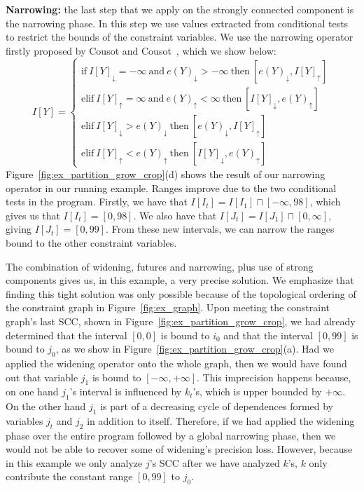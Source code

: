 \documentclass{sigplanconf}[10pt]
\newcommand{\lb}[1]{#1_{\downarrow}}
\newcommand{\ub}[1]{#1_{\uparrow}}
\begin{document}
\noindent
\textbf{Narrowing: } the last step that we apply on the strongly connected
component is the narrowing phase.
In this step we use values extracted from conditional tests to restrict the
bounds of the constraint variables.
We use the narrowing operator firstly proposed by Cousot and
Cousot~\cite{Cousot77}, which we show below:
%
\begin{equation*}
I[Y] =
\begin{cases}
\mbox{if} \ \lb{I[Y]} = -\infty  \ \mbox{and} \ \lb{e(Y)} > -\infty \ \mbox{then} \ [\lb{e(Y)}, \ub{I[Y]}] \\
\mbox{elif} \ \ub{I[Y]} = \infty \ \mbox{and} \ \ub{e(Y)} < \infty \ \mbox{then}
\ [\lb{I[Y]}, \ub{e(Y)}] \\
\mbox{elif} \ \lb{I[Y]} > \lb{e(Y)} \ \mbox{then} \ [\lb{e(Y)}, \ub{I[Y]}] \\
\mbox{elif} \ \ub{I[Y]} < \ub{e(Y)} \ \mbox{then} \ [\lb{I[Y]}, \ub{e(Y)}]
\end{cases}
\end{equation*}
%
Figure~\ref{fig:ex_partition_grow_crop}(d) shows the result of our narrowing
operator in our running example.
Ranges improve due to the two conditional tests in the program.
Firstly, we have that $I[I_t] = I[I_1] \sqcap [-\infty, 98]$, which gives us
that $I[I_t] = [0, 98]$.
We also have that $I[J_t] = I[J_1] \sqcap [0, \infty]$, giving
$I[J_t] = [0, 99]$.
From these new intervals, we can narrow the ranges bound to the other constraint
variables.

The combination of widening, futures and narrowing, plus use of strong components
gives us, in this example, a very precise solution.
We emphasize that finding this tight solution was only possible because of
the topological ordering of the constraint graph in Figure~\ref{fig:ex_graph}.
Upon meeting the constraint graph's last SCC, shown in
Figure~\ref{fig:ex_partition_grow_crop}, we had already determined that the
interval $[0, 0]$ is bound to $i_0$ and that the interval $[0, 99]$ is bound to
$j_0$, as we show in Figure~\ref{fig:ex_partition_grow_crop}(a).
Had we applied the widening operator onto the whole graph, then we would
have found out that variable $j_1$ is bound to $[-\infty, +\infty]$.
This imprecision happens because, on one hand $j_1$'s interval is influenced
by $k_t$'s, which is upper bounded by $+\infty$.
On the other hand $j_1$ is part of a decreasing cycle of dependences formed by
variables $j_t$ and $j_2$ in addition to itself.
Therefore, if we had applied the widening phase over the entire program followed
by a global narrowing phase, then we would not be able to recover some of
widening's precision loss.
However, because in this example we only analyze $j$'s SCC after we have
analyzed $k$'s, $k$ only contribute the constant range $[0, 99]$ to $j_0$.
\end{document}
